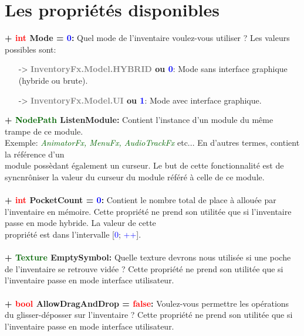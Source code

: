 \documentclass[a4paper, 11pt]{article}
\begin{document}
	\section{Les propriétés disponibles}
	\textbf{+ \textcolor{red}{int} Mode = \textcolor{blue}{0}:} Quel mode de l'inventaire voulez-vous 
	utiliser ? Les valeurs possibles sont:
	\begin{itemize}
		\item[-> \textbf{\textcolor{gray}{InventoryFx.Model.HYBRID} ou \textcolor{blue}{0}}:] Mode sans
		interface graphique (hybride ou brute).
		\item[-> \textbf{\textcolor{gray}{InventoryFx.Model.UI} ou \textcolor{blue}{1}}:] Mode avec
		interface graphique.\\
	\end{itemize}
	\textbf{+ \textcolor{darkgreen}{NodePath} ListenModule:} Contient l'instance d'un module du même trampe
	de ce module. \\Exemple: \textit{\textcolor{darkgreen}{AnimatorFx, MenuFx, AudioTrackFx}} etc... En
	d'autres termes, contient la référence d'un \\module possèdant également un curseur. Le but de cette
	fonctionnalité est de syncnrôniser la valeur du curseur du module référé à celle de ce module.\\\\
	\textbf{+ \textcolor{red}{int} PocketCount = \textcolor{blue}{0}:} Contient le nombre total de place à 
	allouée par l'inventaire en mémoire. Cette propriété ne prend son utilitée que si l'inventaire passe 
	en mode hybride. La valeur de cette \\propriété est dans l'intervalle [\textcolor{blue}{0}; 
	\textcolor{blue}{++}].\\\\
	\textbf{+ \textcolor{darkgreen}{Texture} EmptySymbol:} Quelle texture devrons nous utilisée si une poche 
	de l'inventaire se retrouve vidée ? Cette propriété ne prend son utilitée que si l'inventaire passe en 
	mode interface utilisateur.\\\\
	\textbf{+ \textcolor{red}{bool} AllowDragAndDrop = \textcolor{red}{false}:} Voulez-vous permettre les 
	opérations du glisser-déposser sur l'inventaire ? Cette propriété ne prend son utilitée que si 
	l'inventaire passe en mode interface utilisateur.\\\\
\end{document}
